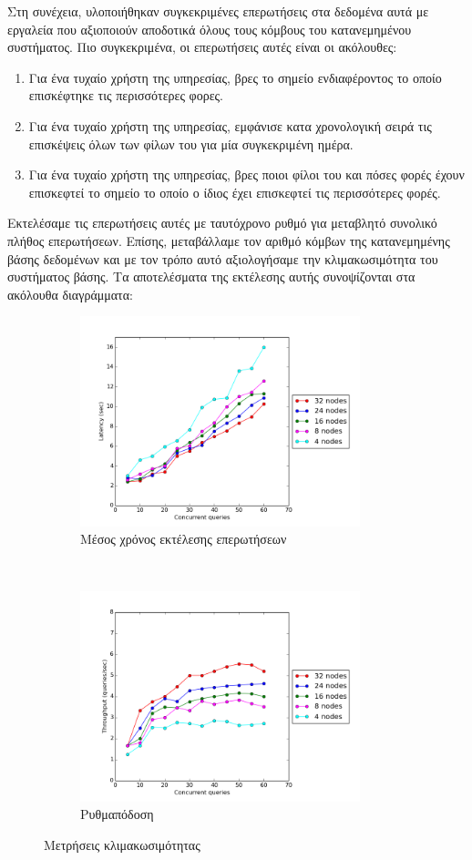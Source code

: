Στη συνέχεια, 
υλοποιήθηκαν συγκεκριμένες επερωτήσεις στα δεδομένα αυτά με εργαλεία που αξιοποιούν αποδοτικά όλους τους κόμβους του κατανεμημένου συστήματος. 
Πιο συγκεκριμένα, οι επερωτήσεις αυτές είναι οι ακόλουθες: 
\begin{enumerate}
 \item Για ένα τυχαίο χρήστη της υπηρεσίας, βρες το σημείο ενδιαφέροντος το οποίο επισκέφτηκε τις περισσότερες φορες.
 \item Για ένα τυχαίο χρήστη της υπηρεσίας, εμφάνισε κατα χρονολογική σειρά τις επισκέψεις όλων των φίλων του για μία συγκεκριμένη ημέρα.
 \item Για ένα τυχαίο χρήστη της υπηρεσίας, βρες ποιοι φίλοι του και πόσες φορές έχουν επισκεφτεί το σημείο το οποίο ο ίδιος έχει επισκεφτεί τις περισσότερες φορές. 
\end{enumerate}

Εκτελέσαμε τις επερωτήσεις αυτές με ταυτόχρονο ρυθμό για μεταβλητό συνολικό πλήθος \linebreak επερωτήσεων. Επίσης, μεταβάλλαμε τον αριθμό κόμβων της κατανεμημένης βάσης 
δεδομένων και με τον τρόπο αυτό αξιολογήσαμε την κλιμακωσιμότητα του συστήματος βάσης. Τα αποτελέσματα της εκτέλεσης αυτής συνοψίζονται στα ακόλουθα 
διαγράμματα:

\begin{figure}[H]
    \centering
    \begin{subfigure}[t]{0.5\textwidth}
        \centering
        \includegraphics[height=2.4in]{figures/scalability_latency.png}
        \caption{Μέσος χρόνος εκτέλεσης επερωτήσεων}
    \end{subfigure}%
    ~ 
    \begin{subfigure}[t]{0.5\textwidth}
        \centering
        \includegraphics[height=2.4in]{figures/scalability_throughput.png}
        \caption{Ρυθμαπόδοση}
    \end{subfigure}
    \caption{Μετρήσεις κλιμακωσιμότητας}
\end{figure}

